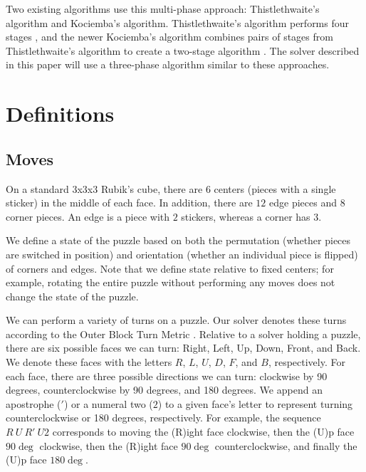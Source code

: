 \documentclass{article}
\begin{document}
Two existing algorithms use this multi-phase approach: Thistlethwaite's algorithm and Kociemba's algorithm. Thistlethwaite's algorithm performs four stages \cite{thistle}, and the newer Kociemba's algorithm combines pairs of stages from Thistlethwaite's algorithm to create a two-stage algorithm \cite{kociemba-2phase}. The solver described in this paper will use a three-phase algorithm similar to these approaches. %


\section{Definitions}

\subsection{Moves}
On a standard 3x3x3 Rubik's cube, there are $6$ centers (pieces with a single sticker) in the middle of each face. In addition, there are $12$ edge pieces and $8$ corner pieces. An edge is a piece with $2$ stickers, whereas a corner has $3$.

We define a state of the puzzle based on both the permutation (whether pieces are switched in position) and orientation (whether an individual piece is flipped) of corners and edges. Note that we define state relative to fixed centers; for example, rotating the entire puzzle without performing any moves does not change the state of the puzzle.

We can perform a variety of turns on a puzzle. Our solver denotes these turns according to the Outer Block Turn Metric \cite{wca-regs}. Relative to a solver holding a puzzle, there are six possible faces we can turn: Right, Left, Up, Down, Front, and Back. We denote these faces with the letters $R$, $L$, $U$, $D$, $F$, and $B$, respectively. For each face, there are three possible directions we can turn: clockwise by 90 degrees, counterclockwise by 90 degrees, and 180 degrees. We append an apostrophe ($'$) or a numeral two ($2$) to a given face's letter to represent turning counterclockwise or 180 degrees, respectively. For example, the sequence $R\ U\ R'\ U2$ corresponds to moving the (R)ight face clockwise, then the (U)p face $90 \deg$ clockwise, then the (R)ight face $90 \deg$ counterclockwise, and finally the (U)p face $180 \deg$.
\end{document}
